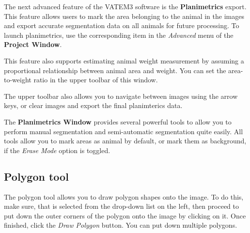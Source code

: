 \documentclass[10pt,a4paper,oneside]{report}             %
\begin{document}
The next advanced feature of the VATEM3 software is the \textbf{Planimetrics }export. This feature allows users to mark the area belonging to the animal in the images and export accurate segmentation data on all animals for future processing. To launch planimetrics, use the corresponding item in the \textit{Advanced} menu of the \textbf{Project Window}.

This feature also supports estimating animal weight measurement by assuming a proportional relationship between animal area and weight. You can set the area-to-weight ratio in the upper toolbar of this window. 

The upper toolbar also allows you to navigate between images using the arrow keys, or clear images and export the final planimterics data. 

The \textbf{Planimetrics Window} provides several powerful tools to allow you to perform manual segmentation and semi-automatic segmentation quite easily. All tools allow you to mark areas as animal by default, or mark them as background, if the \textit{Erase Mode} option is toggled.

\subsection{Polygon tool}

The polygon tool allows you to draw polygon shapes onto the image. To do this, make sure, that  is selected from the drop-down list on the left, then proceed to put down the outer corners of the polygon onto the image by clicking on it. Once finished, click the \textit{Draw Polygon} button. You can put down multiple polygons.
\end{document}

